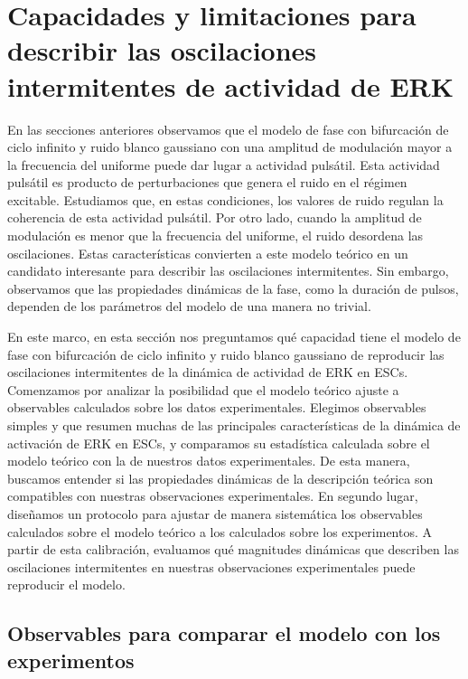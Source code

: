 \documentclass[./main.tex]{subfiles}
\begin{document}
\section{Capacidades y limitaciones para describir las oscilaciones intermitentes de actividad de ERK}


En las secciones anteriores observamos que el modelo de fase con bifurcación de ciclo infinito y ruido blanco gaussiano con una amplitud de modulación mayor a la frecuencia del uniforme puede dar lugar a actividad pulsátil. Esta actividad pulsátil es producto de perturbaciones que genera el ruido en el régimen excitable. Estudiamos que, en estas condiciones, los valores de ruido regulan la coherencia de esta actividad pulsátil. Por otro lado, cuando la amplitud de modulación es menor que la frecuencia del uniforme, el ruido desordena las oscilaciones. Estas características convierten a este modelo teórico en un candidato interesante para describir las oscilaciones intermitentes. Sin embargo, observamos que las propiedades dinámicas de la fase, como la duración de pulsos, dependen de los parámetros del modelo de una manera no trivial.  

En este marco, en esta sección nos preguntamos qué capacidad tiene el modelo de fase con bifurcación de ciclo infinito y ruido blanco gaussiano de reproducir las oscilaciones intermitentes de la dinámica de actividad de ERK en ESCs. Comenzamos por analizar la posibilidad que el modelo teórico ajuste a observables calculados sobre los datos experimentales. Elegimos observables simples y que resumen muchas de las principales características de la dinámica de activación de ERK en ESCs, y comparamos su estadística calculada sobre el modelo teórico con la de nuestros datos experimentales. De esta manera, buscamos entender si las propiedades dinámicas de la descripción teórica son compatibles con nuestras observaciones experimentales. En segundo lugar, diseñamos un protocolo para ajustar de manera sistemática los observables calculados sobre el modelo teórico a los calculados sobre los experimentos. A partir de esta calibración, evaluamos qué magnitudes dinámicas que describen las oscilaciones intermitentes en nuestras observaciones experimentales puede reproducir el modelo.


\subsection{Observables para comparar el modelo con los experimentos}
\end{document}
